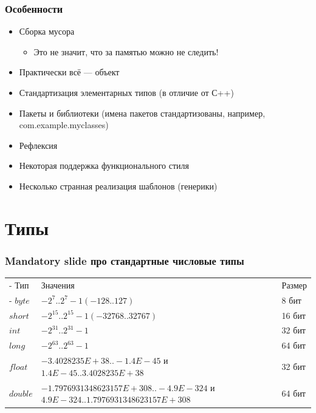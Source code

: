 \documentclass[xetex,mathserif,serif]{beamer}
\begin{document}
	\begin{frame}
		\frametitle{Особенности}
		\begin{itemize}
			\item Сборка мусора
			\begin{itemize}
				\item Это не значит, что за памятью можно не следить!
			\end{itemize}
			\item Практически всё --- объект
			\item Стандартизация элементарных типов (в отличие от С++)
			\item Пакеты и библиотеки (имена пакетов стандартизованы, например, com.example.myclasses)
			\item Рефлексия
			\item Некоторая поддержка функционального стиля
			\item Несколько странная реализация шаблонов (генерики)
		\end{itemize}
	\end{frame}

	\section{Типы}

	\begin{frame}
		\frametitle{Mandatory slide про стандартные числовые типы}
		\begin{tabu} {| X[0.3 l p] | X[1 l p] | X[0.2 l p] |}
			\tabucline-
			Тип       & Значения                                                                              & Размер  \\
			\tabucline-
			\everyrow{\tabucline-}
			$byte$    & $-2^7..2^7-1 (-128..127)$                                                             & 8 бит   \\
			$short$   & $-2^15..2^15-1 (-32768..32767)$                                                       & 16 бит  \\
			$int$     & $-2^31..2^31-1$                                                                       & 32 бит  \\
			$long$    & $-2^63 .. 2^63-1$                                                                     & 64 бит  \\
			$float$   & $-3.4028235E+38..-1.4E-45$ \newline и $1.4E-45..3.4028235E+38$                        & 32 бит  \\
			$double$  & $-1.7976931348623157E+308..-4.9E-324$ \newline и $4.9E-324..1.7976931348623157E+308$  & 64 бит  \\
		\end{tabu}
	\end{frame}
\end{document}
